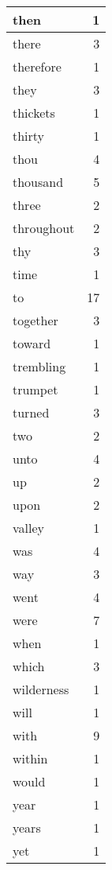 \begin{center}
\begin{longtable}{l|r}
then & 1 \\ \hline
there & 3 \\ \hline
therefore & 1 \\ \hline
they & 3 \\ \hline
thickets & 1 \\ \hline
thirty & 1 \\ \hline
thou & 4 \\ \hline
thousand & 5 \\ \hline
three & 2 \\ \hline
throughout & 2 \\ \hline
thy & 3 \\ \hline
time & 1 \\ \hline
to & 17 \\ \hline
together & 3 \\ \hline
toward & 1 \\ \hline
trembling & 1 \\ \hline
trumpet & 1 \\ \hline
turned & 3 \\ \hline
two & 2 \\ \hline
unto & 4 \\ \hline
up & 2 \\ \hline
upon & 2 \\ \hline
valley & 1 \\ \hline
was & 4 \\ \hline
way & 3 \\ \hline
went & 4 \\ \hline
were & 7 \\ \hline
when & 1 \\ \hline
which & 3 \\ \hline
wilderness & 1 \\ \hline
will & 1 \\ \hline
with & 9 \\ \hline
within & 1 \\ \hline
would & 1 \\ \hline
year & 1 \\ \hline
years & 1 \\ \hline
yet & 1 \\ \hline
\end{longtable}
\end{center}



\normalsize



